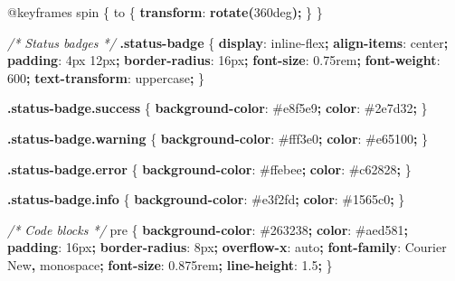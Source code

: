 \documentclass[
]{article}
\newenvironment{Shaded}{\begin{snugshade}}{\end{snugshade}}
\newcommand{\BuiltInTok}[1]{#1}
\newcommand{\CommentTok}[1]{\textcolor[rgb]{0.56,0.35,0.01}{\textit{#1}}}
\newcommand{\ConstantTok}[1]{\textcolor[rgb]{0.56,0.35,0.01}{#1}}
\newcommand{\DataTypeTok}[1]{\textcolor[rgb]{0.13,0.29,0.53}{#1}}
\newcommand{\DecValTok}[1]{\textcolor[rgb]{0.00,0.00,0.81}{#1}}
\newcommand{\FunctionTok}[1]{\textcolor[rgb]{0.13,0.29,0.53}{\textbf{#1}}}
\newcommand{\ImportTok}[1]{#1}
\newcommand{\KeywordTok}[1]{\textcolor[rgb]{0.13,0.29,0.53}{\textbf{#1}}}
\newcommand{\NormalTok}[1]{#1}
\newcommand{\OperatorTok}[1]{\textcolor[rgb]{0.81,0.36,0.00}{\textbf{#1}}}
\newcommand{\StringTok}[1]{\textcolor[rgb]{0.31,0.60,0.02}{#1}}
\begin{document}
\begin{Shaded}
\begin{Highlighting}[]
\ImportTok{@keyframes}\NormalTok{ spin \{}
\NormalTok{  to \{}
    \KeywordTok{transform}\NormalTok{: }\FunctionTok{rotate(}\DecValTok{360}\DataTypeTok{deg}\FunctionTok{)}\OperatorTok{;}
\NormalTok{  \}}
\NormalTok{\}}

\CommentTok{/* Status badges */}
\FunctionTok{.status{-}badge}\NormalTok{ \{}
  \KeywordTok{display}\NormalTok{: }\DecValTok{inline{-}flex}\OperatorTok{;}
  \KeywordTok{align{-}items}\NormalTok{: }\DecValTok{center}\OperatorTok{;}
  \KeywordTok{padding}\NormalTok{: }\DecValTok{4}\DataTypeTok{px} \DecValTok{12}\DataTypeTok{px}\OperatorTok{;}
  \KeywordTok{border{-}radius}\NormalTok{: }\DecValTok{16}\DataTypeTok{px}\OperatorTok{;}
  \KeywordTok{font{-}size}\NormalTok{: }\DecValTok{0.75}\DataTypeTok{rem}\OperatorTok{;}
  \KeywordTok{font{-}weight}\NormalTok{: }\DecValTok{600}\OperatorTok{;}
  \KeywordTok{text{-}transform}\NormalTok{: }\DecValTok{uppercase}\OperatorTok{;}
\NormalTok{\}}

\FunctionTok{.status{-}badge.success}\NormalTok{ \{}
  \KeywordTok{background{-}color}\NormalTok{: }\ConstantTok{\#e8f5e9}\OperatorTok{;}
  \KeywordTok{color}\NormalTok{: }\ConstantTok{\#2e7d32}\OperatorTok{;}
\NormalTok{\}}

\FunctionTok{.status{-}badge.warning}\NormalTok{ \{}
  \KeywordTok{background{-}color}\NormalTok{: }\ConstantTok{\#fff3e0}\OperatorTok{;}
  \KeywordTok{color}\NormalTok{: }\ConstantTok{\#e65100}\OperatorTok{;}
\NormalTok{\}}

\FunctionTok{.status{-}badge.error}\NormalTok{ \{}
  \KeywordTok{background{-}color}\NormalTok{: }\ConstantTok{\#ffebee}\OperatorTok{;}
  \KeywordTok{color}\NormalTok{: }\ConstantTok{\#c62828}\OperatorTok{;}
\NormalTok{\}}

\FunctionTok{.status{-}badge.info}\NormalTok{ \{}
  \KeywordTok{background{-}color}\NormalTok{: }\ConstantTok{\#e3f2fd}\OperatorTok{;}
  \KeywordTok{color}\NormalTok{: }\ConstantTok{\#1565c0}\OperatorTok{;}
\NormalTok{\}}

\CommentTok{/* Code blocks */}
\NormalTok{pre \{}
  \KeywordTok{background{-}color}\NormalTok{: }\ConstantTok{\#263238}\OperatorTok{;}
  \KeywordTok{color}\NormalTok{: }\ConstantTok{\#aed581}\OperatorTok{;}
  \KeywordTok{padding}\NormalTok{: }\DecValTok{16}\DataTypeTok{px}\OperatorTok{;}
  \KeywordTok{border{-}radius}\NormalTok{: }\DecValTok{8}\DataTypeTok{px}\OperatorTok{;}
  \KeywordTok{overflow{-}x}\NormalTok{: }\BuiltInTok{auto}\OperatorTok{;}
  \KeywordTok{font{-}family}\NormalTok{: }\StringTok{\textquotesingle{}Courier New\textquotesingle{}}\OperatorTok{,} \DecValTok{monospace}\OperatorTok{;}
  \KeywordTok{font{-}size}\NormalTok{: }\DecValTok{0.875}\DataTypeTok{rem}\OperatorTok{;}
  \KeywordTok{line{-}height}\NormalTok{: }\DecValTok{1.5}\OperatorTok{;}
\NormalTok{\}}


\end{Highlighting}
\end{Shaded}
\end{document}
